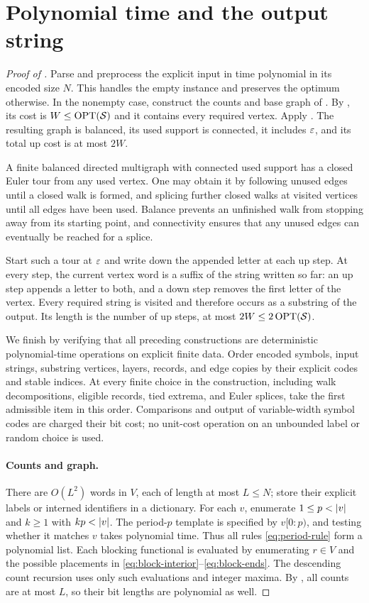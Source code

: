 \section{Polynomial time and the output string}\label{sec:algorithm}

\begin{proof}[Proof of ]
Parse and preprocess the explicit input in time polynomial in its encoded size $N$. This handles the empty instance and preserves the optimum otherwise. In the nonempty case, construct the counts and base graph of . By , its cost is $W\le\operatorname{OPT}(\mathcal S)$ and it contains every required vertex. Apply . The resulting graph is balanced, its used support is connected, it includes $\varepsilon$, and its total up cost is at most $2W$.

A finite balanced directed multigraph with connected used support has a closed Euler tour from any used vertex. One may obtain it by following unused edges until a closed walk is formed, and splicing further closed walks at visited vertices until all edges have been used. Balance prevents an unfinished walk from stopping away from its starting point, and connectivity ensures that any unused edges can eventually be reached for a splice.

Start such a tour at $\varepsilon$ and write down the appended letter at each up step. At every step, the current vertex word is a suffix of the string written so far: an up step appends a letter to both, and a down step removes the first letter of the vertex. Every required string is visited and therefore occurs as a substring of the output. Its length is the number of up steps, at most $2W\le2\operatorname{OPT}(\mathcal S)$.

We finish by verifying that all preceding constructions are deterministic polynomial-time operations on explicit finite data. Order encoded symbols, input strings, substring vertices, layers, records, and edge copies by their explicit codes and stable indices. At every finite choice in the construction, including walk decompositions, eligible records, tied extrema, and Euler splices, take the first admissible item in this order. Comparisons and output of variable-width symbol codes are charged their bit cost; no unit-cost operation on an unbounded label or random choice is used.

\paragraph{Counts and graph.}
There are $O(L^2)$ words in $V$, each of length at most $L\le N$; store their explicit labels or interned identifiers in a dictionary. For each $v$, enumerate $1\le p<\lvert v\rvert$ and $k\ge1$ with $kp<\lvert v\rvert$. The period-$p$ template is specified by $v[0:p)$, and testing whether it matches $v$ takes polynomial time. Thus all rules \eqref{eq:period-rule} form a polynomial list. Each blocking functional is evaluated by enumerating $r\in V$ and the possible placements in \eqref{eq:block-interior}--\eqref{eq:block-ends}. The descending count recursion uses only such evaluations and integer maxima. By , all counts are at most $L$, so their bit lengths are polynomial as well.


\end{proof}
